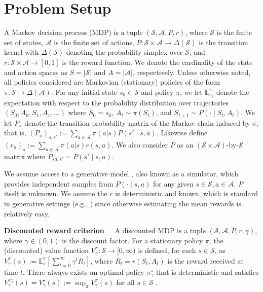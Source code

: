 \documentclass{article}
\theoremstyle{plain}
\theoremstyle{plain}
\theoremstyle{remark}
\theoremstyle{plain}
\theoremstyle{plain}
\newcommand{\E}{\mathbb{E}}
\newcommand{\pistar}{\pi^\star}
\newcommand{\A}{\mathcal{A}}
\renewcommand{\S}{\mathcal{S}}
\begin{document}
\section{Problem Setup}


A Markov decision process (MDP) is a tuple $(\S, \A, P, r)$, where $\S$ is the finite set of states, $\A$ is the finite set of actions, $P : \S \times \A \to \Delta(\S)$ is the transition kernel with $\Delta(\S)$ denoting the probability simplex over $\S$, and $r : \S \times \A \to [0,1]$ is the reward function. We denote the cardinality of the state and action spaces as $S = |\S|$ and $A = |\A|$, respectively. Unless otherwise noted, all policies considered are Markovian (stationary) policies of the form $\pi : \S \to \Delta(\A)$. For any initial state $s_0 \in \S$ and policy $\pi$, we let $\E^\pi_{s_0}$ denote the expectation with respect to the probability distribution over trajectories $(S_0, A_0, S_1, A_1, \dots)$ where $S_0 = s_0$, $A_t \sim \pi(S_t)$, and $S_{t+1} \sim P(\cdot \mid S_t, A_t)$. 
We let $P_\pi$ denote the transition probability matrix of the Markov chain induced by $\pi$, that is, $\left(P_\pi\right)_{s,s'} := \sum_{a \in \A} \pi(a | s) P(s' \mid s, a)$. Likewise define $(r_\pi)_{s} := \sum_{a \in \A} \pi(a | s) r(s, a)$. We also consider $P$ as an $(\S \times \A)$-by-$ \S$ matrix where $P_{sa, s'} = P(s' \mid s, a)$.

We assume access to a generative model \citep{kearns_finite-sample_1998}, also known as a simulator, which provides independent samples from $P(\cdot \mid s, a)$ for any given $s \in \S, a \in \A$. $P$ itself is unknown. We assume the $r$ is deterministic and known, which is standard in generative settings (e.g., \citealt{agarwal_model-based_2020, li_breaking_2020}) since otherwise estimating the mean rewards is relatively easy.

\textbf{Discounted reward criterion~~} A discounted MDP is a tuple $(\S, \A, P, r, \gamma)$, where $\gamma \in (0,1)$ is the discount factor. For a stationary policy $\pi$, the (discounted) value function $V^\pi_\gamma : \S \to [0, \infty)$ is defined, for each $s \in \S$, as $V^\pi_\gamma(s) := \E^\pi_s \left[\sum_{t=0}^\infty \gamma^t R_t \right]$,
where $R_t = r(S_t, A_t)$ is the reward received at time $t$. There always exists an optimal policy $\pistar_\gamma$ that is deterministic and satisfies $V_\gamma^{\pistar_\gamma}(s) = V_\gamma^\star(s) := \sup_{\pi} V_\gamma^\pi(s)$ for all $s \in \S$ \citep{puterman_markov_1994}.
\end{document}
